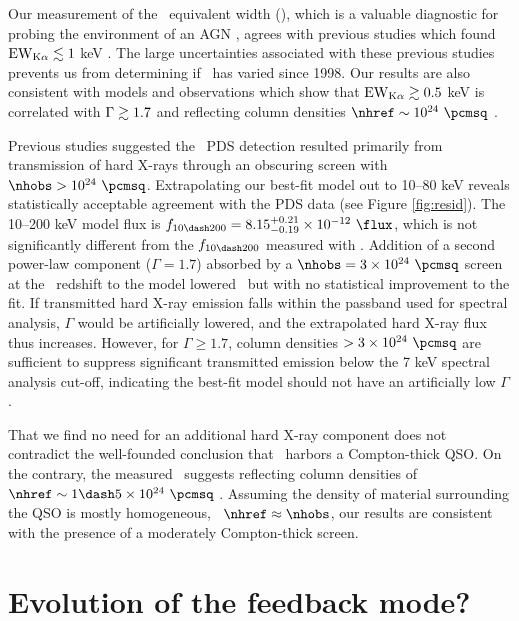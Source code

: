 \documentclass[useAMS,usenatbib]{mn2e}
\begin{document}
Our measurement of the \feka\ equivalent width (\fekaew), which is a
valuable diagnostic for probing the environment of an AGN
\citep[see][for a review]{2000PASP..112.1145F}, agrees with previous
studies which found $\mathrm{EW}_{\mathrm{K}\alpha} \lesssim 1$ keV \citep{2000A&A...353..910F,
  2001MNRAS.321L..15I, 2007A&A...473...85P}. The large uncertainties
associated with these previous studies prevents us from determining if
\fekaew\ has varied since 1998. Our results are also consistent with
models and observations which show that $\mathrm{EW}_{\mathrm{K}\alpha} \gtrsim 0.5$ keV is
correlated with $\Gamma \gtrsim 1.7$ and reflecting column densities
$\nhref \sim 10^{24} ~\pcmsq$ \citep{1996MNRAS.280..823M,
  1997ApJ...477..602N, 1999MNRAS.303L..11Z, 2005A&A...444..119G}.

Previous studies suggested the \bepposax\ PDS detection resulted
primarily from transmission of hard X-rays through an obscuring screen
with $\nhobs > 10^{24} ~\pcmsq$. Extrapolating our best-fit model out
to 10--80 keV reveals statistically acceptable agreement with the PDS
data (see Figure \ref{fig:resid}). The 10--200 keV model flux is
$f_{10 \dash 200} = 8.15^{+0.21}_{-0.19} \times 10^{-12} ~\flux$,
which is not significantly different from the $f_{10 \dash 200}$
measured with \bepposax. Addition of a second power-law component
($\Gamma = 1.7$) absorbed by a $\nhobs = 3 \times 10^{24} ~\pcmsq$
screen at the \irs\ redshift to the model lowered \chisq\ but with no
statistical improvement to the fit. If transmitted hard X-ray emission
falls within the passband used for spectral analysis, $\Gamma$ would
be artificially lowered, and the extrapolated hard X-ray flux thus
increases. However, for $\Gamma \ge 1.7$, column densities $> 3 \times
10^{24} ~\pcmsq$ are sufficient to suppress significant transmitted
emission below the 7 keV spectral analysis cut-off, indicating the
best-fit model should not have an artificially low $\Gamma$.

That we find no need for an additional hard X-ray component does not
contradict the well-founded conclusion that \irs\ harbors a
Compton-thick QSO. On the contrary, the measured \fekaew\ suggests
reflecting column densities of $\nhref \sim 1 \dash 5 \times 10^{24}
~\pcmsq$ \citep{1993MNRAS.263..314L, 2005A&A...444..119G,
  2010arXiv1005.3253C}. Assuming the density of material surrounding
the QSO is mostly homogeneous, \ie\ $\nhref \approx \nhobs$, our
results are consistent with the presence of a moderately Compton-thick
screen.

\section{Evolution of the feedback mode?}
\label{sec:evo}
\end{document}

